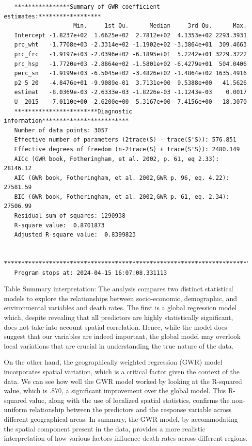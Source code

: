 \documentclass[
]{article}
\begin{document}
\begin{verbatim}
   ****************Summary of GWR coefficient estimates:******************
                    Min.     1st Qu.      Median     3rd Qu.      Max.
   Intercept -1.8237e+02  1.6625e+02  2.7812e+02  4.1353e+02 2293.3931
   prc_wht   -1.7708e+03 -2.3314e+02 -1.1902e+02 -3.3864e+01  309.4663
   prc_frc   -1.9197e+03 -2.0396e+02 -6.1895e+01  5.2242e+01 3229.3222
   prc_hsp   -1.7720e+03 -2.8864e+02 -1.5801e+02 -6.4279e+01  504.0406
   perc_sn   -1.9199e+03 -6.5045e+02 -3.4826e+02 -1.4864e+02 1635.4916
   p2_5_20   -4.8476e+01 -9.9089e-01  3.7131e+00  9.5388e+00   41.5626
   estimat   -8.0369e-03 -2.6333e-03 -1.8226e-03 -1.1243e-03    0.0017
   U__2015   -7.0110e+00  2.6200e+00  5.3167e+00  7.4156e+00   18.3070
   ************************Diagnostic information*************************
   Number of data points: 3057 
   Effective number of parameters (2trace(S) - trace(S'S)): 576.851 
   Effective degrees of freedom (n-2trace(S) + trace(S'S)): 2480.149 
   AICc (GWR book, Fotheringham, et al. 2002, p. 61, eq 2.33): 28146.12 
   AIC (GWR book, Fotheringham, et al. 2002,GWR p. 96, eq. 4.22): 27581.59 
   BIC (GWR book, Fotheringham, et al. 2002,GWR p. 61, eq. 2.34): 27506.99 
   Residual sum of squares: 1290938 
   R-square value:  0.8701873 
   Adjusted R-square value:  0.8399823 

   ***********************************************************************
   Program stops at: 2024-04-15 16:07:08.331113 
\end{verbatim}

Table Summary interpretation: The analysis compares two distinct
statistical models to explore the relationships between socio-economic,
demographic, and environmental variables and death rates. The first is a
global regression model which, despite revealing that all predictors are
highly statistically significant, does not take into account spatial
correlation. Hence, while the model does suggest that our variables are
indeed important, the global model may overlook local variations that
are crucial in understanding the true nature of the data.~

On the other hand, the geographically weighted regression (GWR) model
incorporates spatial variation, which is a critical factor given the
context of the data. We can see how well the GWR model worked by looking
at the R-squared value, which is .870, a significant improvement over
the global model. This R-squared value, along with the use of localized
spatial statistics, confirms the non-uniform relationship between the
predictors and the response variable across different geographical
areas. In summary, the GWR model, by accommodating the spatial component
present in the data, provides a more realistic interpretation of how
various factors influence death rates across different regions.
\end{document}
